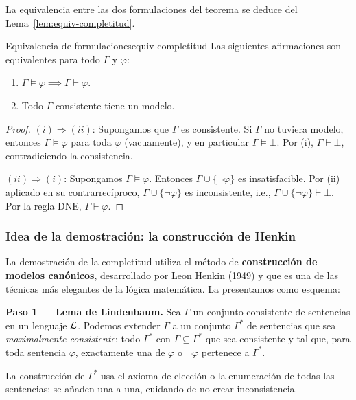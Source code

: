 La equivalencia entre las dos formulaciones del teorema se deduce del Lema~\ref{lem:equiv-completitud}.

\begin{lema}{Equivalencia de formulaciones}{equiv-completitud}
Las siguientes afirmaciones son equivalentes para todo $\Gamma$ y $\varphi$:
\begin{enumerate}[label=(\roman*), leftmargin=2em]
  \item $\Gamma \models \varphi \implies \Gamma \vdash \varphi$.
  \item Todo $\Gamma$ consistente tiene un modelo.
\end{enumerate}
\end{lema}

\begin{proof}
$(i) \Rightarrow (ii)$: Supongamos que $\Gamma$ es consistente. Si $\Gamma$ no tuviera modelo, entonces $\Gamma \models \varphi$ para toda $\varphi$ (vacuamente), y en particular $\Gamma \models \bot$. Por (i), $\Gamma \vdash \bot$, contradiciendo la consistencia.

$(ii) \Rightarrow (i)$: Supongamos $\Gamma \models \varphi$. Entonces $\Gamma \cup \{\neg\varphi\}$ es insatisfacible. Por (ii) aplicado en su contrarrecíproco, $\Gamma \cup \{\neg\varphi\}$ es inconsistente, i.e., $\Gamma \cup \{\neg\varphi\} \vdash \bot$. Por la regla DNE, $\Gamma \vdash \varphi$.
\end{proof}

\subsubsection{Idea de la demostración: la construcción de Henkin}

La demostración de la completitud utiliza el método de \textbf{construcción de modelos canónicos}, desarrollado por Leon Henkin (1949) y que es una de las técnicas más elegantes de la lógica matemática. La presentamos como esquema:

\medskip
\textbf{Paso 1 — Lema de Lindenbaum.} Sea $\Gamma$ un conjunto consistente de sentencias en un lenguaje $\mathcal{L}$. Podemos extender $\Gamma$ a un conjunto $\Gamma^*$ de sentencias que sea \emph{maximalmente consistente}: todo $\Gamma^*$ con $\Gamma \subseteq \Gamma^*$ que sea consistente y tal que, para toda sentencia $\varphi$, exactamente una de $\varphi$ o $\neg\varphi$ pertenece a $\Gamma^*$.

La construcción de $\Gamma^*$ usa el axioma de elección o la enumeración de todas las sentencias: se añaden una a una, cuidando de no crear inconsistencia.

